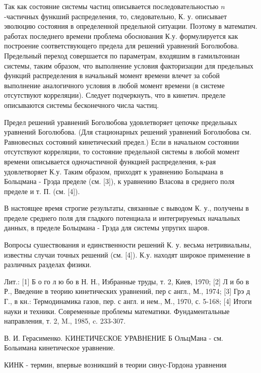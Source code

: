 \documentclass[10pt]{article}
\begin{document}
Так как состояние системы частиц описывается последовательностью $n$-частичных функший распределения, то, следовательно, К. у. описывает эволюцию состояния в определенной предельной ситуации. Поэтому в математич. работах последнего времени проблема обоснования К.у. формулируется как построение соответствующего предела для решений уравнений Боголюбова. Предельный переход совершается по параметрам, входяшим в гамильтониан системы, таким образом, что выполнение условия факторизации для предельных функций распределения в начальный момент времени влечет за собой выполнение аналогичного условия в любой момент времени (в системе отсутствуют корреляции). Следует подчеркнуть, что в кинетич. пределе описываются системы бесконечного числа частиц.



Предел решений уравнений Боголюбова удовлетворяет цепочке предельных уравнений Боголюбова. (Для стационарных решений уравнений Боголюбова см. Равновесных состояний кинетический предел.) Если в начальном состоянии отсутствуют корреляции, то состояние предельной системы в любой момент времени описывается одночастичной функцией распределения, к-рая удовлетворяет К.у. Таким образом, приходят к уравнению Больцмана в Больцмана - Грэда пределе (см. [3]), к уравнению Власова в среднего поля пределе и т. П. (см. [4]).



В настоящее время строгие результаты, связанные с выводом К. у., получены в пределе среднего поля для гладкого потенциала и интегрируемых начальных данных, в пределе Больцмана - Грэда для системы упругих шаров.



Вопросы сушествования и единственности решений К. у. весьма нетривиальны, известны случаи точных решений (см. [4]). К.у. находят широкое применение в различных разделах физики.



Лит.: [1] Б о го л ю бо в Н. Н., Избранные труды, т. 2, Киев, 1970; [2] Л и бо в Р., Введение в теорию кинетических уравнений, пер с англ., М., 1974; [3] Грэ д Г., в кн.: Термодинамика газов, пер. с англ. и нем., М., 1970, с. 5-168; [4] Итоги науки и техники. Современные проблемы математики. Фундаментальные направления, т. 2, M., 1985, c. 233-307.



В. И. Герасименко. KИНЕТИЧЕСКОЕ УРАВНЕНИЕ Б ОльцМана - см. Больимана кинетическое уравнение.



КИНК - термин, впервые возникший в теории синус-Гордона уравнения
\end{document}
